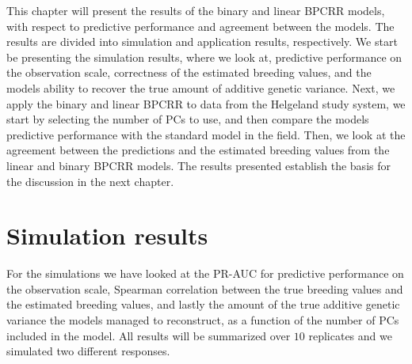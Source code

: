 


This chapter will present the results of the binary and linear BPCRR models, with respect to predictive performance and agreement between the models. The results are divided into simulation and application results, respectively. We start be presenting the simulation results, where we look at, predictive performance on the observation scale, correctness of the estimated breeding values, and the models ability to recover the true amount of additive genetic variance. Next, we apply the binary and linear BPCRR to data from the Helgeland study system, we start by selecting the number of PCs to use, and then compare the models predictive performance with the standard model in the field. Then, we look at the agreement between the predictions and the estimated breeding values from the linear and binary BPCRR models. The results presented establish the basis for the discussion in the next chapter. 

 

\section{Simulation results}


For the simulations we have looked at the PR-AUC for predictive performance on the observation scale, Spearman correlation between the true breeding values and the estimated breeding values, and lastly the amount of the true additive genetic variance the models managed to reconstruct, as a function of the number of PCs included in the model. All results will be summarized over $10$ replicates and we simulated two different responses. 

